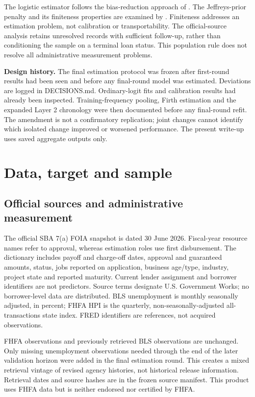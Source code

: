 The logistic estimator follows the bias-reduction approach of \citet{firth1993}. The Jeffreys-prior penalty and its finiteness properties are examined by \citet{kosmidis2021}. Finiteness addresses an estimation problem, not calibration or transportability. The official-source analysis retains unresolved records with sufficient follow-up, rather than conditioning the sample on a terminal loan status. This population rule does not resolve all administrative measurement problems.

\textbf{Design history.} The final estimation protocol was frozen after first-round results had been seen and before any final-round model was estimated. Deviations are logged in DECISIONS.md. Ordinary-logit fits and calibration results had already been inspected. Training-frequency pooling, Firth estimation and the expanded Layer 2 chronology were then documented before any final-round refit. The amendment is not a confirmatory replication; joint changes cannot identify which isolated change improved or worsened performance. The present write-up uses saved aggregate outputs only.

\section{Data, target and sample}
\subsection{Official sources and administrative measurement}
The official SBA 7(a) FOIA snapshot is dated 30 June 2026. Fiscal-year resource names refer to approval, whereas estimation roles use first disbursement. The dictionary includes payoff and charge-off dates, approval and guaranteed amounts, status, jobs reported on application, business age/type, industry, project state and reported maturity. Current lender assignment and borrower identifiers are not predictors. Source terms designate U.S. Government Works; no borrower-level data are distributed. BLS unemployment is monthly seasonally adjusted, in percent; FHFA HPI is the quarterly, non-seasonally-adjusted all-transactions state index. FRED identifiers are references, not acquired observations.

FHFA observations and previously retrieved BLS observations are unchanged. Only missing unemployment observations needed through the end of the later validation horizon were added in the final estimation round. This creates a mixed retrieval vintage of revised agency histories, not historical release information. Retrieval dates and source hashes are in the frozen source manifest. This product uses FHFA data but is neither endorsed nor certified by FHFA.

